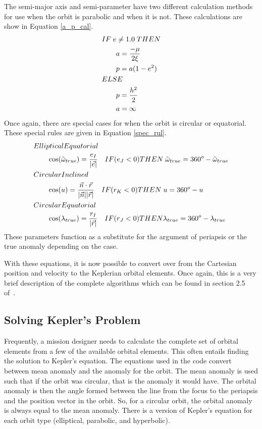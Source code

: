 The semi-major axis and semi-parameter have two different calculation methods
for use when the orbit is parabolic and when it is not.  These calculations
are show in Equation \ref{a_p_cal}.
\begin{equation}
\begin{split}
& IF\thickspace e \neq 1.0\thickspace THEN\\
&\qquad a=\frac{-\mu}{2\xi}\\
&\qquad p=a(1-e^2)\\
&ELSE\\
&\qquad p =\frac{h^2}{2}\\
&\qquad a= \infty
\end{split}
\label{a_p_cal}
\end{equation}
Once again, there are special cases for when the orbit is circular or equatorial.
These special rules are given in Equation \ref{spec_rul}.
\begin{equation}
\begin{split}
&Elliptical Equatorial \\
&\qquad \cos(\tilde{\omega}_{true})=\frac{e_I}{|\vec{e}|}
   \quad IF(e_J<0)THEN \thickspace \tilde{\omega}_{true} = 360^o-\tilde{\omega}_{true}\\
&Circular Inclined \\
&\qquad \cos(u)=\frac{\vec{n}\cdot\vec{r}}{|\vec{n}||\vec{r}|}
   \quad IF(r_K<0)THEN \thickspace u = 360^o-u\\
&Circular Equatorial\\
&\qquad \cos(\lambda_{true}) = \frac{r_I}{|\vec{r}|}
   \quad IF(r_J<0)THEN\lambda_{true}=360^o-\lambda_{true}
\end{split}
\label{spec_rul}
\end{equation}
These parameters function as a substitute for the argument of periapsis or the
true anomaly depending on the case.

With these equations, it is now possible to convert over from the Cartesian
position and velocity to the Keplerian orbital elements.  Once again, this is
a very brief description of the complete algorithms which can be found in
section 2.5 of~\cite{Vallado}.

\subsection{Solving Kepler's Problem}
Frequently, a mission designer needs to calculate the complete set of orbital
elements from a few of the available orbital elements.  This often entails
finding the solution to Kepler's equation.  The equations used in the code
convert between mean anomaly and the anomaly for the orbit.  The mean anomaly is
used such that if the orbit was circular, that is the anomaly it would have.
The orbital anomaly is then the angle formed between the line from the focus to the
periapsis and the position vector in the orbit.  So, for a circular orbit, the
orbital anomaly is always equal to the mean anomaly.  There is a version of Kepler's
equation for each orbit type (elliptical, parabolic, and hyperbolic).

